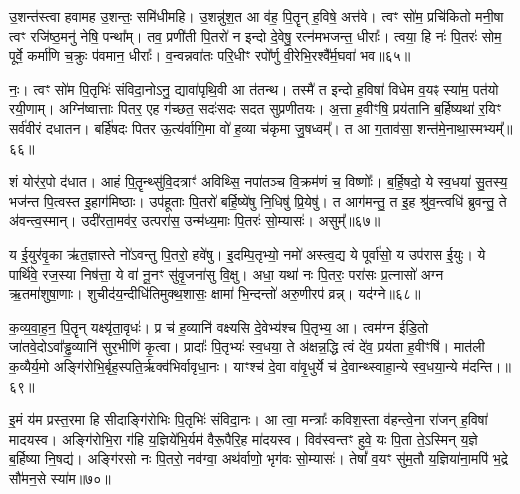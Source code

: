 उ॒शन्त॑स्त्वा हवामह उ॒शन्तः॒ समि॑धीमहि। उ॒शन्नु॑श॒त आ व॑ह॒ पि॒तॄन् ह॒विषे॒ अत्त॑वे। त्वꣳ सो॑म॒ प्रचि॑कितो मनी॒षा त्वꣳ रजि॑ष्ठ॒मनु॑ नेषि॒ पन्था᳚म्। तव॒ प्रणी॑ती पि॒तरो॑ न इन्दो दे॒वेषु॒ रत्न॑मभजन्त॒ धीराः᳚। त्वया॒ हि नः॑ पि॒तरः॑ सोम॒ पूर्वे॒ कर्मा॑णि च॒क्रुः प॑वमान॒ धीराः᳚। व॒न्वन्नवा॑तः परि॒धीꣳ रपो᳚र्णु वी॒रेभि॒रश्वै᳚र्म॒घवा॑ भव॥६५॥

नः॒। त्वꣳ सो॑म पि॒तृभिः॑ संविदा॒नो\-ऽनु॒ द्यावा॑पृथि॒वी आ त॑तन्थ। तस्मै॑ त इन्दो ह॒विषा॑ विधेम व॒यꣴ स्या॑म॒ पत॑यो रयी॒णाम्। अग्नि॑ष्वात्ताः पितर॒ एह ग॑च्छत॒ सदः॑सदः सदत सुप्रणीतयः। अ॒त्ता ह॒वीꣳषि॒ प्रय॑तानि ब॒र्\mbox{}हिष्यथा॑ र॒यिꣳ सर्व॑वीरं दधातन। बर्\mbox{}हि॑षदः पितर ऊ॒त्य॑र्वागि॒मा वो॑ ह॒व्या च॑कृमा जु॒षध्वम्᳚। त आ ग॒ताव॑सा॒ शन्त॑मे॒नाथा॒स्मभ्यम्᳚॥६६॥

शं योर॑र॒पो द॑धात। आहं पि॒त़ॄन्थ्सु॑वि॒दत्राꣳ॑ अविथ्सि॒ नपा॑तञ्च वि॒क्रम॑णं च॒ विष्णोः᳚। ब॒र्\mbox{}हि॒षदो॒ ये स्व॒धया॑ सु॒तस्य॒ भज॑न्त पि॒त्वस्त इ॒हाग॑मिष्ठाः। उप॑हूताः पि॒तरो॑ बर्\mbox{}हि॒ष्ये॑षु नि॒धिषु॑ प्रि॒येषु॑। त आग॑मन्तु॒ त इ॒ह श्रु॑व॒न्त्वधि॑ ब्रुवन्तु॒ ते अ॑वन्त्व॒स्मान्। उदी॑रता॒मव॑र॒ उत्परा॑स॒ उन्म॑ध्य॒माः पि॒तरः॑ सो॒म्यासः॑। असुम्᳚॥६७॥

य ई॒युर॑वृ॒का ऋ॑त॒ज्ञास्ते नो॑\-ऽवन्तु पि॒तरो॒ हवे॑षु। इ॒दम्पि॒तृभ्यो॒ नमो॑ अस्त्व॒द्य ये पूर्वा॑सो॒ य उप॑रास ई॒युः। ये पार्थि॑वे॒ रज॒स्या निष॑त्ता॒ ये वा॑ नू॒नꣳ सु॑वृ॒जना॑सु वि॒क्षु। अधा॒ यथा॑ नः पि॒तरः॒ परा॑सः प्र॒त्नासो॑ अग्न ऋ॒तमा॑शुषा॒णाः। शुचीद॑य॒न्दीधि॑तिमुक्थ॒शासः॒ क्षामा॑ भि॒न्दन्तो॑ अरु॒णीरप॑ व्रन्न्। यद॑ग्ने॥६८॥

क॒व्य॒वा॒ह॒न॒ पि॒तॄन् यक्ष्यृ॑ता॒वृधः॑। प्र च॑ ह॒व्यानि॑ वक्ष्यसि दे॒वेभ्य॑श्च पि॒तृभ्य॒ आ। त्वम॑ग्न ईडि॒तो जा॑तवे॒दो\-ऽवा᳚ड्ढ॒व्यानि॑ सुर॒भीणि॑ कृ॒त्वा। प्रादाः᳚ पि॒तृभ्यः॑ स्व॒धया॒ ते अ॑क्षन्न॒द्धि त्वं दे॑व॒ प्रय॑ता ह॒वीꣳषि॑। मात॑ली क॒व्यैर्य॒मो अङ्गि॑रोभि॒र्बृह॒स्पति॒र्\mbox{}ऋक्व॑भिर्वावृधा॒नः। याꣳश्च॑ दे॒वा वा॑वृ॒धुर्ये च॑ दे॒वान्थ्स्वाहा॒न्ये स्व॒धया॒न्ये म॑दन्ति।॥६९॥

इ॒मं य॑म प्रस्त॒रमा हि सीदाङ्गि॑रोभिः पि॒तृभिः॑ संविदा॒नः। आ त्वा॒ मन्त्राः᳚ कविश॒स्ता व॑हन्त्वे॒ना रा॑जन् ह॒विषा॑ मादयस्व। अङ्गि॑रोभि॒रा ग॑हि य॒ज्ञिये॑भि॒र्यम॑ वैरू॒पैरि॒ह मा॑दयस्व। विव॑स्वन्तꣳ हुवे॒ यः पि॒ता ते॒\-ऽस्मिन् य॒ज्ञे ब॒र्\mbox{}हिष्या नि॒षद्य॑। अङ्गि॑रसो नः पि॒तरो॒ नव॑ग्वा॒ अथ॑र्वाणो॒ भृग॑वः सो॒म्यासः॑। तेषां᳚ व॒यꣳ सु॑म॒तौ य॒ज्ञिया॑ना॒मपि॑ भ॒द्रे सौ॑मन॒से स्या॑म॥७०॥


{\anuvakamend[{भ॒वा॒स्मभ्य॒मसुं॒ यद॑ग्ने मदन्ति सौमन॒स एक॑ञ्च॥12॥}]}


